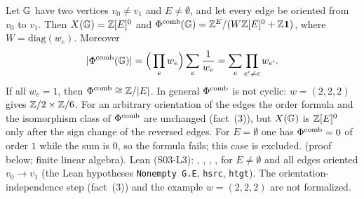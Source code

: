 \begin{proposition}\label{prop:s03-phi}
Let $\mathbb{G}$ have two vertices $v_0\ne v_1$ and $E\ne\emptyset$, and let every edge be oriented from $v_0$ to $v_1$. Then $X(\mathbb{G})=\mathbb{Z}[E]^0$ and $\Phi^{\mathrm{comb}}(\mathbb{G})=\mathbb{Z}^E/(W\mathbb{Z}[E]^0+\mathbb{Z}\mathbf1)$, where
$W=\mathrm{diag}(w_e)$. Moreover
\[|\Phi^{\mathrm{comb}}(\mathbb{G})|=\Big(\prod_ew_e\Big)\sum_e\frac1{w_e}=\sum_e\prod_{e'\ne e}w_{e'}.\]
If all $w_e=1$, then $\Phi^{\mathrm{comb}}\cong\mathbb{Z}/|E|$. In general $\Phi^{\mathrm{comb}}$ is not cyclic: $w=(2,2,2)$ gives $\mathbb{Z}/2\times\mathbb{Z}/6$.
For an arbitrary orientation of the edges the order formula and the isomorphism class of $\Phi^{\mathrm{comb}}$ are unchanged (fact~(3)), but $X(\mathbb{G})$ is
$\mathbb{Z}[E]^0$ only after the sign change of the reversed edges. For $E=\emptyset$ one has $\Phi^{\mathrm{comb}}=0$ of order $1$ while the sum is $0$, so the
formula fails; this case is excluded.
\stproved{} (proof below; finite linear algebra). Lean (S03-L3): ,
, ,
 \stformal{}, for $E\ne\emptyset$ and all edges oriented $v_0\to v_1$ (the Lean hypotheses
\texttt{Nonempty G.E}, \texttt{hsrc}, \texttt{htgt}). The orientation-independence step (fact~(3)) and the example $w=(2,2,2)$ are not formalized.
\end{proposition}

